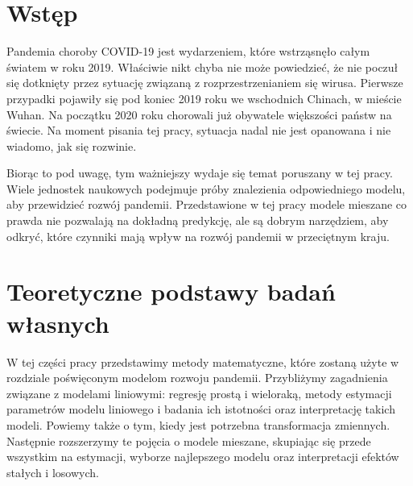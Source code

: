 \documentclass[12pt]{mwbk}
\theoremstyle{plain}
\theoremstyle{definition}
\theoremstyle{definition}
\begin{document}



\tableofcontents


\chapter*{Wstęp}




Pandemia choroby COVID-19 jest wydarzeniem, które wstrząsnęło całym światem w roku 2019. Właściwie nikt chyba nie może powiedzieć, że nie poczuł się dotknięty przez sytuację związaną z rozprzestrzenianiem się wirusa. Pierwsze przypadki pojawiły się pod koniec 2019 roku we wschodnich Chinach, w mieście Wuhan. Na początku 2020 roku chorowali już obywatele większości państw na świecie. Na moment pisania tej pracy, sytuacja nadal nie jest opanowana i nie wiadomo, jak się rozwinie.

Biorąc to pod uwagę, tym ważniejszy wydaje się temat poruszany w tej pracy. Wiele jednostek naukowych podejmuje próby znalezienia odpowiedniego modelu, aby przewidzieć rozwój pandemii. Przedstawione w tej pracy modele mieszane co prawda nie pozwalają na dokładną predykcję, ale są dobrym narzędziem, aby odkryć, które czynniki mają wpływ na rozwój pandemii w przeciętnym kraju.











\chapter{Teoretyczne podstawy badań własnych}
W tej części pracy przedstawimy metody matematyczne, które zostaną użyte w rozdziale poświęconym modelom rozwoju pandemii. Przybliżymy zagadnienia związane z modelami liniowymi: regresję prostą i wieloraką, metody estymacji parametrów modelu liniowego i badania ich istotności oraz interpretację takich modeli. Powiemy także o tym, kiedy jest potrzebna transformacja zmiennych. Następnie rozszerzymy te pojęcia o modele mieszane, skupiając się przede wszystkim na estymacji, wyborze najlepszego modelu oraz interpretacji efektów stałych i losowych.
\end{document}
